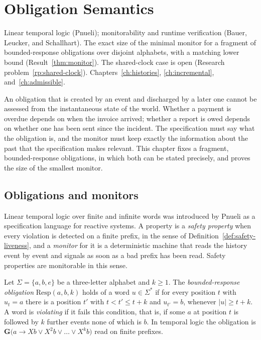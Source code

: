 \chapter{Obligation Semantics}\label{ch:obligations}
{Linear temporal logic (Pnueli); monitorability and runtime verification (Bauer, Leucker, and Schallhart).}
{The exact size of the minimal monitor for a fragment of bounded-response obligations over disjoint alphabets, with a matching lower bound (Result~\ref{thm:monitor}).}
{The shared-clock case is open (Research problem~\ref{rp:shared-clock}).}
{Chapters~\ref{ch:histories}, \ref{ch:incremental}, and~\ref{ch:admissible}.}

An obligation that is created by an event and discharged by a later one cannot be assessed from the instantaneous state of the world. Whether a payment is overdue depends on when the invoice arrived; whether a report is owed depends on whether one has been sent since the incident. The specification must say what the obligation is, and the monitor must keep exactly the information about the past that the specification makes relevant. This chapter fixes a fragment, bounded-response obligations, in which both can be stated precisely, and proves the size of the smallest monitor.

\section{Obligations and monitors}

\begin{established}
Linear temporal logic over finite and infinite words was introduced by Pnueli as a specification language for reactive systems. A property is a \emph{safety property} when every violation is detected on a finite prefix, in the sense of Definition~\ref{def:safety-liveness}, and a \emph{monitor} for it is a deterministic machine that reads the history event by event and signals as soon as a bad prefix has been read. Safety properties are monitorable in this sense.
\end{established}

\begin{definition}\label{def:bounded-response}
Let $\Sigma=\{a,b,e\}$ be a three-letter alphabet and $k\ge1$. The \emph{bounded-response obligation} $\mathrm{Resp}(a,b,k)$ holds of a word $u\in\Sigma^{*}$ if for every position $t$ with $u_t=a$ there is a position $t'$ with $t<t'\le t+k$ and $u_{t'}=b$, whenever $|u|\ge t+k$. A word is \emph{violating} if it fails this condition, that is, if some $a$ at position $t$ is followed by $k$ further events none of which is $b$. In temporal logic the obligation is $\mathbf G\bigl(a\to X b\vee X^{2}b\vee\dots\vee X^{k}b\bigr)$ read on finite prefixes.
\end{definition}

